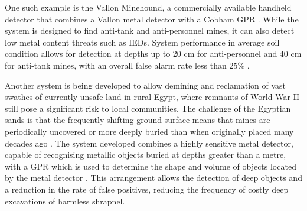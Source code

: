 \documentclass[main.tex]{subfiles}
\begin{document}
\begin{appendices}

One such example is the Vallon Minehound, a commercially available handheld detector that combines a Vallon metal detector with a Cobham GPR \parencite{WM2016}. While the system is designed to find anti-tank and anti-personnel mines, it can also detect low metal content threats such as IEDs. 
System performance in average soil condition allows for detection at depths up to 20 cm for anti-personnel and 40 cm for anti-tank mines, with an overall false alarm rate less than 25\% \parencite{daniels2005}.

Another system is being developed to allow demining and reclamation of vast swathes of currently unsafe land in rural Egypt, where remnants of World War II still pose a significant risk to local communities. The challenge of the Egyptian sands is that the frequently shifting ground surface means that mines are periodically uncovered or more deeply buried than when originally placed many decades ago \parencite{NATOnewsroom}. The system developed combines a highly sensitive metal detector, capable of recognising metallic objects buried at depths greater than a metre, with a GPR which is used to determine the shape and volume of objects located by the metal detector \parencite{NATOnewsroom}. This arrangement allows the detection of deep objects and a reduction in the rate of false positives, reducing the frequency of costly deep excavations of harmless shrapnel.



\end{appendices}
\end{document}
